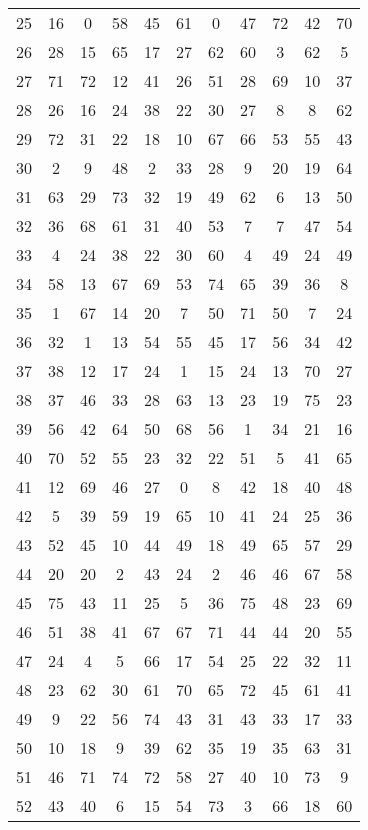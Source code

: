 \begin{table}
\begin{tabular}{c c c c c c c c c c c }
25 & 16 & 0 & 58 & 45 & 61 & 0 & 47 & 72 & 42 & 70 \\
26 & 28 & 15 & 65 & 17 & 27 & 62 & 60 & 3 & 62 & 5 \\
27 & 71 & 72 & 12 & 41 & 26 & 51 & 28 & 69 & 10 & 37 \\
28 & 26 & 16 & 24 & 38 & 22 & 30 & 27 & 8 & 8 & 62 \\
29 & 72 & 31 & 22 & 18 & 10 & 67 & 66 & 53 & 55 & 43 \\
30 & 2 & 9 & 48 & 2 & 33 & 28 & 9 & 20 & 19 & 64 \\
31 & 63 & 29 & 73 & 32 & 19 & 49 & 62 & 6 & 13 & 50 \\
32 & 36 & 68 & 61 & 31 & 40 & 53 & 7 & 7 & 47 & 54 \\
33 & 4 & 24 & 38 & 22 & 30 & 60 & 4 & 49 & 24 & 49 \\
34 & 58 & 13 & 67 & 69 & 53 & 74 & 65 & 39 & 36 & 8 \\
35 & 1 & 67 & 14 & 20 & 7 & 50 & 71 & 50 & 7 & 24 \\
36 & 32 & 1 & 13 & 54 & 55 & 45 & 17 & 56 & 34 & 42 \\
37 & 38 & 12 & 17 & 24 & 1 & 15 & 24 & 13 & 70 & 27 \\
38 & 37 & 46 & 33 & 28 & 63 & 13 & 23 & 19 & 75 & 23 \\
39 & 56 & 42 & 64 & 50 & 68 & 56 & 1 & 34 & 21 & 16 \\
40 & 70 & 52 & 55 & 23 & 32 & 22 & 51 & 5 & 41 & 65 \\
41 & 12 & 69 & 46 & 27 & 0 & 8 & 42 & 18 & 40 & 48 \\
42 & 5 & 39 & 59 & 19 & 65 & 10 & 41 & 24 & 25 & 36 \\
43 & 52 & 45 & 10 & 44 & 49 & 18 & 49 & 65 & 57 & 29 \\
44 & 20 & 20 & 2 & 43 & 24 & 2 & 46 & 46 & 67 & 58 \\
45 & 75 & 43 & 11 & 25 & 5 & 36 & 75 & 48 & 23 & 69 \\
46 & 51 & 38 & 41 & 67 & 67 & 71 & 44 & 44 & 20 & 55 \\
47 & 24 & 4 & 5 & 66 & 17 & 54 & 25 & 22 & 32 & 11 \\
48 & 23 & 62 & 30 & 61 & 70 & 65 & 72 & 45 & 61 & 41 \\
49 & 9 & 22 & 56 & 74 & 43 & 31 & 43 & 33 & 17 & 33 \\
50 & 10 & 18 & 9 & 39 & 62 & 35 & 19 & 35 & 63 & 31 \\
51 & 46 & 71 & 74 & 72 & 58 & 27 & 40 & 10 & 73 & 9 \\
52 & 43 & 40 & 6 & 15 & 54 & 73 & 3 & 66 & 18 & 60 \\

\end{tabular}
\end{table}
